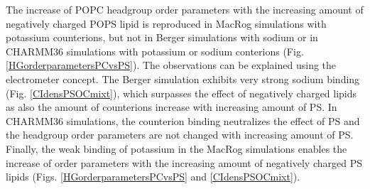 \documentclass[aps,prl,superscriptaddress,twocolumn]{revtex4}
\begin{document}
The increase of POPC headgroup order parameters with the increasing
amount of negatively charged POPS lipid is reproduced in
MacRog simulations with potassium counterions, but not in 
Berger simulations with sodium or in CHARMM36 simulations
with potassium or sodium conterions (Fig. \ref{HGorderparametersPCvsPS}). 
The observations can be explained using the electrometer concept.
The Berger simulation exhibits very strong sodium binding (Fig. \ref{CIdensPSOCmixt}), 
which surpasses the effect of negatively charged lipids as also the amount of
counterions increase with increasing amount of PS.
In CHARMM36 simulations, the counterion binding neutralizes the effect
of PS and the headgroup order parameters are not changed with increasing amount
of PS. Finally, the weak binding of potassium in the MacRog simulations
enables the increase of order parameters with the increasing amount of
negatively charged PS lipids (Figs. \ref{HGorderparametersPCvsPS} and \ref{CIdensPSOCmixt}).
\end{document}
